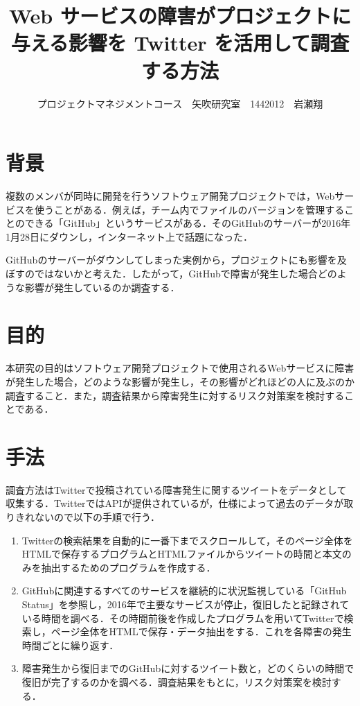 \documentclass[uplatex,twocolumn,dvipdfmx]{jsarticle}
\title{\vspace{-5mm}\fontsize{14pt}{0pt}\selectfont Web サービスの障害がプロジェクトに与える影響を Twitter を活用して調査する方法}
\author{\normalsize プロジェクトマネジメントコース　矢吹研究室　1442012　岩瀬翔}
\date{}
\begin{document}
\fontsize{10.5pt}{\baselineskip}\selectfont
\maketitle





\section{背景}
複数のメンバが同時に開発を行うソフトウェア開発プロジェクトでは，Webサービスを使うことがある．例えば，チーム内でファイルのバージョンを管理することのできる「GitHub」というサービスがある\cite{01}．そのGitHubのサーバーが2016年1月28日にダウンし，インターネット上で話題になった\cite{02}．

GitHubのサーバーがダウンしてしまった実例から，プロジェクトにも影響を及ぼすのではないかと考えた．したがって，GitHubで障害が発生した場合どのような影響が発生しているのか調査する．
\section{目的}
本研究の目的はソフトウェア開発プロジェクトで使用されるWebサービスに障害が発生した場合，どのような影響が発生し，その影響がどれほどの人に及ぶのか調査すること．また，調査結果から障害発生に対するリスク対策案を検討することである．
\section{手法}
調査方法はTwitterで投稿されている障害発生に関するツイートをデータとして収集する．TwitterではAPIが提供されているが，仕様によって過去のデータが取りきれないので以下の手順で行う\cite{03}．
\begin{enumerate}
 \item Twitterの検索結果を自動的に一番下までスクロールして，そのページ全体をHTMLで保存するプログラムとHTMLファイルからツイートの時間と本文のみを抽出するためのプログラムを作成する．
 \item GitHubに関連するすべてのサービスを継続的に状況監視している「GitHub Status」を参照し，2016年で主要なサービスが停止，復旧したと記録されている時間を調べる．その時間前後を作成したプログラムを用いてTwitterで検索し，ページ全体をHTMLで保存・データ抽出をする．これを各障害の発生時間ごとに繰り返す．
 \item 障害発生から復旧までのGitHubに対するツイート数と，どのくらいの時間で復旧が完了するのかを調べる．調査結果をもとに，リスク対策案を検討する．
\end{enumerate}
\end{document}
